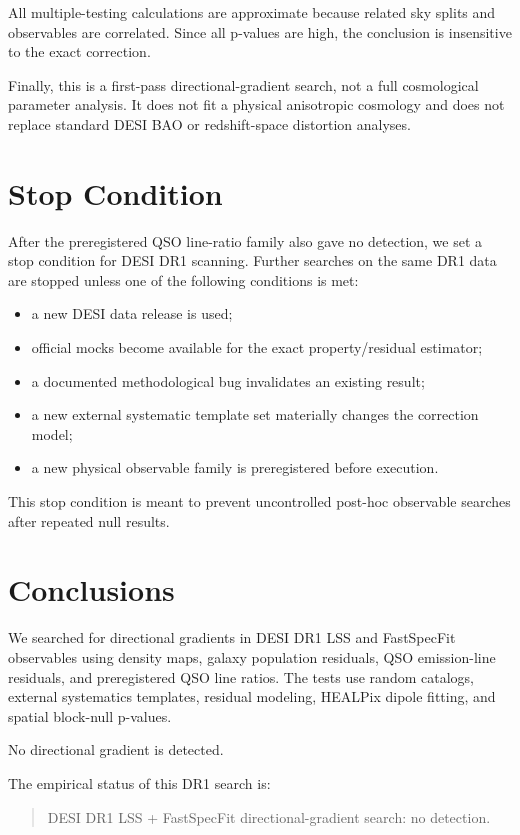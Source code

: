 \documentclass[11pt]{article}
\begin{document}
All multiple-testing calculations are approximate because related sky splits and observables are correlated. Since all p-values are high, the conclusion is insensitive to the exact correction.

Finally, this is a first-pass directional-gradient search, not a full cosmological parameter analysis. It does not fit a physical anisotropic cosmology and does not replace standard DESI BAO or redshift-space distortion analyses.

\section{Stop Condition}

After the preregistered QSO line-ratio family also gave no detection, we set a stop condition for DESI DR1 scanning. Further searches on the same DR1 data are stopped unless one of the following conditions is met:
\begin{itemize}
    \item a new DESI data release is used;
    \item official mocks become available for the exact property/residual estimator;
    \item a documented methodological bug invalidates an existing result;
    \item a new external systematic template set materially changes the correction model;
    \item a new physical observable family is preregistered before execution.
\end{itemize}

This stop condition is meant to prevent uncontrolled post-hoc observable searches after repeated null results.

\section{Conclusions}

We searched for directional gradients in DESI DR1 LSS and FastSpecFit observables using density maps, galaxy population residuals, QSO emission-line residuals, and preregistered QSO line ratios. The tests use random catalogs, external systematics templates, residual modeling, HEALPix dipole fitting, and spatial block-null p-values.

No directional gradient is detected.

The empirical status of this DR1 search is:
\begin{quote}
DESI DR1 LSS + FastSpecFit directional-gradient search: no detection.
\end{quote}
\end{document}
